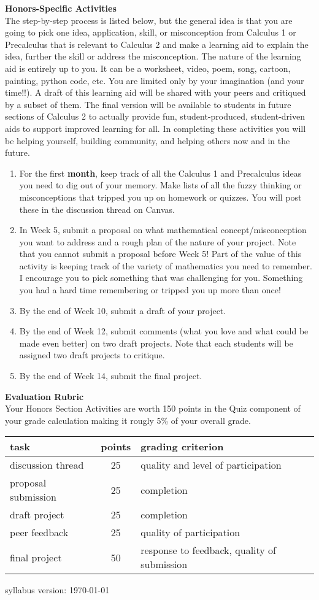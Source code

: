 \documentclass[12pt]{article}
\renewcommand{\emph}[1]{\textsf{\textbf{#1}}}
\newcommand{\localhead}[1]{\par\smallskip\textbf{#1} \smallskip\nobreak\\}%
\def\heading#1{\localhead{\large\emph{#1}}}
\begin{document}
\heading{Honors-Specific Activities}
The step-by-step process is listed below, but the general idea is that you are going to pick one idea, application, skill, or misconception from Calculus 1 or Precalculus that is relevant to Calculus 2 and make a learning aid to explain the idea, further the skill or address the misconception. The nature of the learning aid is entirely up to you. It can be a worksheet, video, poem, song, cartoon, painting, python code, etc. You are limited only by your imagination (and your time!!). A draft of this learning aid will be shared with your peers and critiqued by a subset of them. The final version will be available to students in future sections of Calculus 2 to actually provide fun, student-produced, student-driven aids to support improved learning for all. In completing these activities you will be helping yourself, building community, and helping others now and in the future.


\begin{enumerate}
\item For the first \emph{month}, keep track of all the Calculus 1 and Precalculus ideas you need to dig out of your memory. Make lists of all the fuzzy thinking  or misconceptions that tripped you up on homework or quizzes. You will post these in the discussion thread on Canvas.
\item In Week 5, submit a proposal on what mathematical concept/misconception you want to address and a rough plan of the nature of your project. Note that you cannot submit a proposal before Week 5! Part of the value of this activity is keeping track of the variety of mathematics you need to remember. I encourage you to pick something that was challenging for you. Something you had a hard time remembering or tripped you up more than  once!
\item By the end of Week 10, submit a draft of your project.
\item By the end of Week 12, submit comments (what you love and what could be made even better) on two draft projects. Note that each students will be assigned two draft projects to critique.
\item By the end of Week 14, submit the final project.
\end{enumerate}

\heading{Evaluation Rubric}
Your Honors Section Activities are worth 150 points in the Quiz component of your grade calculation making it rougly 5\% of your overall grade. 

\begin{tabular}{l || c | l}
task & points & grading criterion \\
\hline
discussion thread & 25 & quality and level of participation\\
proposal submission & 25 & completion \\
draft project & 25 & completion \\
peer feedback & 25 & quality of participation \\
final project & 50 & response to feedback, quality of submission
\end{tabular}

 \scriptsize syllabus version: \today \normalsize
\end{document}
